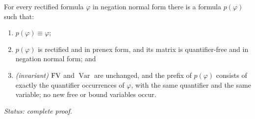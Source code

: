\begin{lemma}
\label{lem:prenex-extraction}
For every rectified formula \(\varphi\) in negation normal form there is
a formula \(p(\varphi)\) such that:
\begin{enumerate}
  \item \(p(\varphi)\equiv\varphi\);
  \item \(p(\varphi)\) is rectified and in prenex form, and its matrix is
        quantifier-free and in negation normal form; and
  \item \emph{(invariant)} \(\operatorname{FV}\) and \(\operatorname{Var}\) are
        unchanged, and the prefix of \(p(\varphi)\) consists of exactly
        the quantifier occurrences of \(\varphi\), with the same
        quantifier and the same variable; no new free or bound variables
        occur.
\end{enumerate}
\textit{Status: complete proof.}
\end{lemma}
